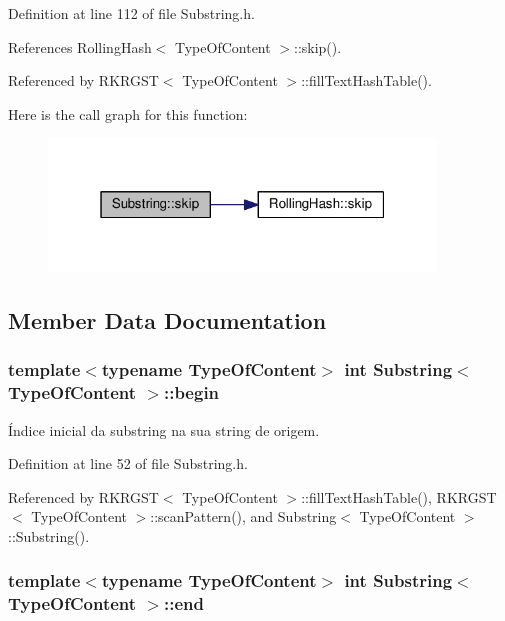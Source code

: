 Definition at line 112 of file Substring.\+h.



References Rolling\+Hash$<$ Type\+Of\+Content $>$\+::skip().



Referenced by R\+K\+R\+G\+S\+T$<$ Type\+Of\+Content $>$\+::fill\+Text\+Hash\+Table().



Here is the call graph for this function\+:\nopagebreak
\begin{figure}[H]
\begin{center}
\leavevmode
\includegraphics[width=292pt]{classSubstring_a618432b07f7469537bd8de5c9dccc02f_cgraph}
\end{center}
\end{figure}




\subsection{Member Data Documentation}
\hypertarget{classSubstring_a88e2864cc7847c7f57815de891246cfe}{
\subsubsection[{begin}]{\setlength{\rightskip}{0pt plus 5cm}template$<$typename Type\+Of\+Content$>$ int {\bf Substring}$<$ Type\+Of\+Content $>$\+::begin}}\label{classSubstring_a88e2864cc7847c7f57815de891246cfe}


Índice inicial da substring na sua string de origem. 



Definition at line 52 of file Substring.\+h.



Referenced by R\+K\+R\+G\+S\+T$<$ Type\+Of\+Content $>$\+::fill\+Text\+Hash\+Table(), R\+K\+R\+G\+S\+T$<$ Type\+Of\+Content $>$\+::scan\+Pattern(), and Substring$<$ Type\+Of\+Content $>$\+::\+Substring().

\hypertarget{classSubstring_a5a223bd1f3483d1ee55f4b3997a48862}{
\subsubsection[{end}]{\setlength{\rightskip}{0pt plus 5cm}template$<$typename Type\+Of\+Content$>$ int {\bf Substring}$<$ Type\+Of\+Content $>$\+::end}}\label{classSubstring_a5a223bd1f3483d1ee55f4b3997a48862}


